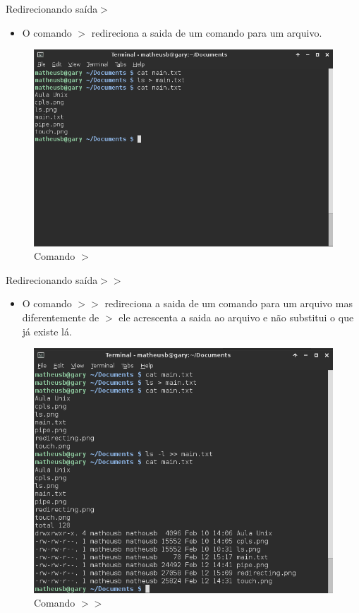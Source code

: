 \documentclass{beamer}
\begin{document}
\begin{frame}{Redirecionando saída}{$>$}
  \begin{itemize}
  \item { O comando \textbf{$>$} redireciona a saida de um comando para um arquivo.
    }\end{itemize}
          \begin{figure}[h!]
        \centering
        \includegraphics[scale=0.30]{redirecting.png}
        \caption{Comando $>$}
        \label{fig:Comando >}
    \end{figure}
\end{frame}

\begin{frame}{Redirecionando saída}{$>>$}
  \begin{itemize}
  \item { O comando \textbf{$>>$} redireciona a saida de um comando para um arquivo mas diferentemente de \textbf{$>$} ele acrescenta a saida ao arquivo e não substitui o que já existe lá.
    }\end{itemize}
          \begin{figure}[h!]
        \centering
        \includegraphics[scale=0.22]{append.png}
        \caption{Comando $>>$}
        \label{fig:Comando >>}
    \end{figure}
\end{frame}
\end{document}
